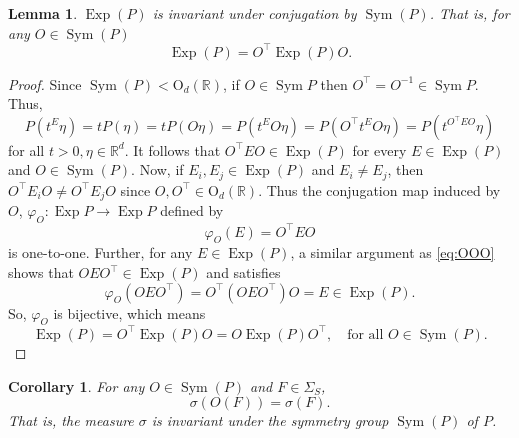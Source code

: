 \documentclass[11pt]{article}
\theoremstyle{theorem}
\newtheorem{lemma}[theorem]{Lemma}
\newtheorem{corollary}[theorem]{Corollary}
\newcommand\OdR{\mbox{O}_d(\mathbb{R})} %
\newcommand\Sym{\operatorname{Sym}}
\newcommand\Exp{\operatorname{Exp}}
\newcommand\R{\mathbb{R}}
\begin{document}
\begin{lemma}\label{lem:ExpP}
$\Exp(P)$ is invariant under conjugation by $\Sym(P)$. That is, for any  $O \in \Sym{(P)} $
\begin{equation*}
    \Exp(P) = O^\top \Exp(P) O.
\end{equation*}
\end{lemma}

\begin{proof}
Since $\Sym(P) < \OdR{}$, if $O\in \Sym{P}$ then $O^\top = O^{-1} \in \Sym{P}$. Thus,
\begin{equation}\label{eq:OOO}
    P(t^E \eta) = tP(\eta) = tP(O\eta) = P(t^E O\eta) = P(O^\top t^E O \eta) = P(t^{O^\top E O }\eta)
\end{equation}
for all $t>0,\eta\in \R^d$. It follows that $O^\top E O \in \Exp(P)$ for every $E\in \Exp(P)$ and $O\in \Sym(P)$.  
Now, if $E_i, E_j\in \Exp(P)$ and $E_i\neq E_j$, then $O^\top E_i O \neq O^\top E_j O$ since $O,O^\top\in \OdR{}$. Thus the conjugation map induced by $O$, $\varphi_O: \Exp{P}\to \Exp{P}$ defined by 
\begin{equation*}
    \varphi_O (E) = O^\top E O
\end{equation*}
is one-to-one. Further, for any $E\in \Exp(P)$, a similar argument as \eqref{eq:OOO} shows that $OEO^\top \in \Exp(P)$ and satisfies
\begin{equation*}
    \varphi_O(OEO^\top) = O^\top (OEO^\top) O = E\in \Exp{(P)}.
\end{equation*}
So, $\varphi_O$ is bijective, which means 
\begin{equation*}
    \Exp(P) = O^\top \Exp(P) O = O \Exp{(P)} O^\top, \quad \text{for all } O\in \Sym{(P)}.
\end{equation*}
\end{proof}



\begin{corollary}
For any $O\in\Sym(P)$ and $F\in\Sigma_S$,
\begin{equation*}
\sigma(O (F))=\sigma(F).
\end{equation*} 
That is, the measure $\sigma$ is invariant under the symmetry group $\Sym(P)$ of $P$. 
\end{corollary}
\end{document}
